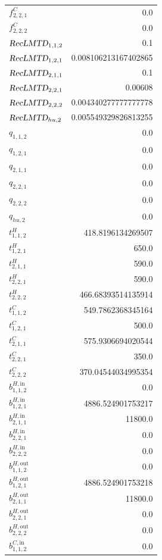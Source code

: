 \documentclass{article}%
\begin{document}
\begin{multicols*}{3}
\begin{supertabular}{lr}
	$f_{2,2,1}^{C}$ & 0.0 \\%
	$f_{2,2,2}^{C}$ & 0.0 \\%
	$\textsl{RecLMTD}_{1,1,2}$ & 0.1 \\%
	$\textsl{RecLMTD}_{1,2,1}$ & 0.008106213167402865 \\%
	$\textsl{RecLMTD}_{2,1,1}$ & 0.1 \\%
	$\textsl{RecLMTD}_{2,2,1}$ & 0.00608 \\%
	$\textsl{RecLMTD}_{2,2,2}$ & 0.004340277777777778 \\%
	$\textsl{RecLMTD}_{hu,2}$ & 0.005549329826813255 \\%
	$q_{1,1,2}$ & 0.0 \\%
	$q_{1,2,1}$ & 0.0 \\%
	$q_{2,1,1}$ & 0.0 \\%
	$q_{2,2,1}$ & 0.0 \\%
	$q_{2,2,2}$ & 0.0 \\%
	$q_{hu,2}$ & 0.0 \\%
	$t_{1,1,2}^{H}$ & 418.8196134269507 \\%
	$t_{1,2,1}^{H}$ & 650.0 \\%
	$t_{2,1,1}^{H}$ & 590.0 \\%
	$t_{2,2,1}^{H}$ & 590.0 \\%
	$t_{2,2,2}^{H}$ & 466.68393514135914 \\%
	$t_{1,1,2}^{C}$ & 549.7862368345164 \\%
	$t_{1,2,1}^{C}$ & 500.0 \\%
	$t_{2,1,1}^{C}$ & 575.9306694020544 \\%
	$t_{2,2,1}^{C}$ & 350.0 \\%
	$t_{2,2,2}^{C}$ & 370.04544034995354 \\%
	$b_{1,1,2}^{H,\text{in}}$ & 0.0 \\%
	$b_{1,2,1}^{H,\text{in}}$ & 4886.524901753217 \\%
	$b_{2,1,1}^{H,\text{in}}$ & 11800.0 \\%
	$b_{2,2,1}^{H,\text{in}}$ & 0.0 \\%
	$b_{2,2,2}^{H,\text{in}}$ & 0.0 \\%
	$b_{1,1,2}^{H,\text{out}}$ & 0.0 \\%
	$b_{1,2,1}^{H,\text{out}}$ & 4886.524901753218 \\%
	$b_{2,1,1}^{H,\text{out}}$ & 11800.0 \\%
	$b_{2,2,1}^{H,\text{out}}$ & 0.0 \\%
	$b_{2,2,2}^{H,\text{out}}$ & 0.0 \\%
	$b_{1,1,2}^{C,\text{in}}$ & 0.0 \\%

\end{supertabular}
\end{multicols*}
\end{document}
